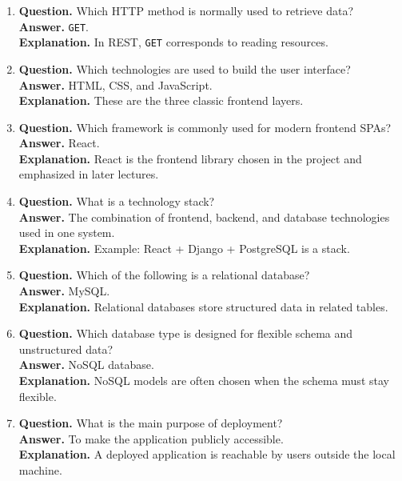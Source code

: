 \documentclass[11pt,a4paper]{article}
\begin{document}
\begin{enumerate}
  \item \textbf{Question.} Which HTTP method is normally used to retrieve data?\\
  \textbf{Answer.} \texttt{GET}.\\
  \textbf{Explanation.} In REST, \texttt{GET} corresponds to reading resources.

  \item \textbf{Question.} Which technologies are used to build the user interface?\\
  \textbf{Answer.} HTML, CSS, and JavaScript.\\
  \textbf{Explanation.} These are the three classic frontend layers.

  \item \textbf{Question.} Which framework is commonly used for modern frontend SPAs?\\
  \textbf{Answer.} React.\\
  \textbf{Explanation.} React is the frontend library chosen in the project and emphasized in later lectures.

  \item \textbf{Question.} What is a technology stack?\\
  \textbf{Answer.} The combination of frontend, backend, and database technologies used in one system.\\
  \textbf{Explanation.} Example: React + Django + PostgreSQL is a stack.

  \item \textbf{Question.} Which of the following is a relational database?\\
  \textbf{Answer.} MySQL.\\
  \textbf{Explanation.} Relational databases store structured data in related tables.

  \item \textbf{Question.} Which database type is designed for flexible schema and unstructured data?\\
  \textbf{Answer.} NoSQL database.\\
  \textbf{Explanation.} NoSQL models are often chosen when the schema must stay flexible.

  \item \textbf{Question.} What is the main purpose of deployment?\\
  \textbf{Answer.} To make the application publicly accessible.\\
  \textbf{Explanation.} A deployed application is reachable by users outside the local machine.


\end{enumerate}
\end{document}
